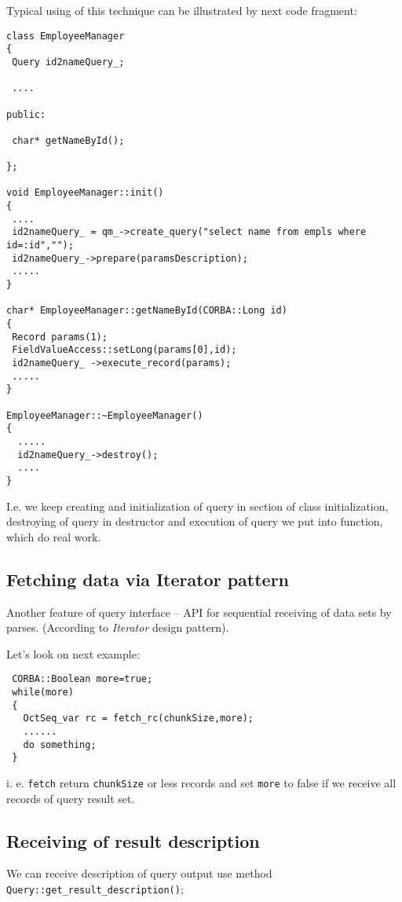 \documentclass[10pt]{article}
\begin{document}
 Typical using of this technique can be illustrated by next code fragment:

\begin{verbatim}
class EmployeeManager
{
 Query id2nameQuery_;
  
 ....
 
public:

 char* getNameById();

};

void EmployeeManager::init()
{
 ....
 id2nameQuery_ = qm_->create_query("select name from empls where id=:id","");
 id2nameQuery_->prepare(paramsDescription);
 .....
}

char* EmployeeManager::getNameById(CORBA::Long id)
{
 Record params(1);
 FieldValueAccess::setLong(params[0],id);
 id2nameQuery_ ->execute_record(params); 
 .....
}

EmployeeManager::~EmployeeManager()
{
  .....
  id2nameQuery_->destroy();
  ....
}

\end{verbatim}

 I.e. we keep creating and initialization of query in section of
class initialization, destroying of query in destructor and execution
of query we put into function, which do real work.

\subsection { Fetching data via Iterator pattern }

 Another feature of query interface -- API for sequential receiving of
data sets by parses. (According to {\em Iterator} design pattern).

 Let's look on next example:

\begin{verbatim}
 CORBA::Boolean more=true;
 while(more)
 {
   OctSeq_var rc = fetch_rc(chunkSize,more);
   ......
   do something;
 }
\end{verbatim}

 i. e. \verb|fetch| return \verb|chunkSize| or less records and set 
 \verb|more| to false if we receive all records of query result set.

\subsection { Receiving of result description  }

 We can receive description of query output  use method
 \verb|Query::get_result_description()|;
\end{document}
